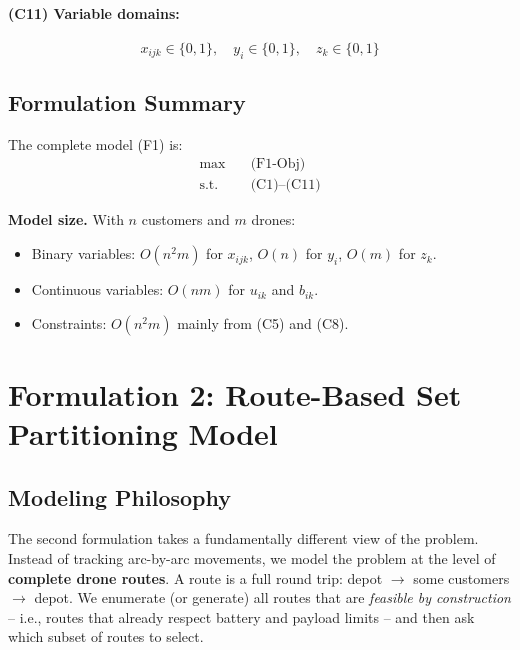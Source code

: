 \documentclass[12pt,a4paper]{article}
\begin{document}
\paragraph{(C11) Variable domains:}
\begin{equation}
  x_{ijk} \in \{0,1\}, \quad y_i \in \{0,1\}, \quad z_k \in \{0,1\}
  \tag{C11}
\end{equation}

\subsection{Formulation Summary}

The complete model (F1) is:
\begin{align*}
  \max \quad & \text{(F1-Obj)}  \\
  \text{s.t.} \quad & \text{(C1)--(C11)}
\end{align*}

\noindent\textbf{Model size.} With $n$ customers and $m$ drones:
\begin{itemize}
  \item Binary variables: $O(n^2 m)$ for $x_{ijk}$, $O(n)$ for $y_i$, $O(m)$ for $z_k$.
  \item Continuous variables: $O(nm)$ for $u_{ik}$ and $b_{ik}$.
  \item Constraints: $O(n^2 m)$ mainly from (C5) and (C8).
\end{itemize}

\section{Formulation 2: Route-Based Set Partitioning Model}

\subsection{Modeling Philosophy}

The second formulation takes a fundamentally different view of the problem. Instead of
tracking arc-by-arc movements, we model the problem at the level of \textbf{complete
drone routes}. A route is a full round trip: depot $\to$ some customers $\to$ depot.
We enumerate (or generate) all routes that are \emph{feasible by construction} -- i.e.,
routes that already respect battery and payload limits -- and then ask which subset of
routes to select.
\end{document}
